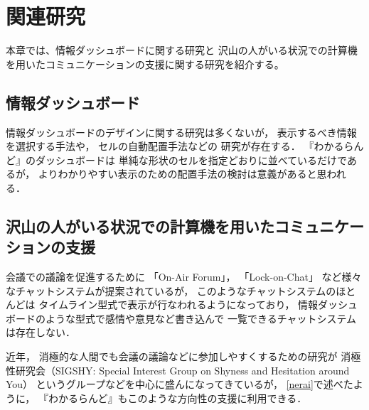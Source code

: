 \chapter{関連研究}
\label{chap:relevant}

本章では、情報ダッシュボードに関する研究と
沢山の人がいる状況での計算機を用いたコミュニケーションの支援に関する研究を紹介する。

\newpage

\section{情報ダッシュボード}

情報ダッシュボードのデザイン\cite{few}に関する研究は多くないが，
表示するべき情報を選択する手法\cite{Jones:2015:ECI:2800835.2800963}や，
セルの自動配置手法\cite{Hertzog:2015:BSP:2678025.2701383}などの
研究が存在する．
『わかるらんど』のダッシュボードは
単純な形状のセルを指定どおりに並べているだけであるが，
よりわかりやすい表示のための配置手法の検討は意義があると思われる．

\section{沢山の人がいる状況での計算機を用いたコミュニケーションの支援}
会議での議論を促進するために
「On-Air Forum」\cite{nishida2011}，
「Lock-on-Chat」\cite{nishida2006}
など様々なチャットシステムが提案されているが，
このようなチャットシステムのほとんどは
タイムライン型式で表示が行なわれるようになっており，
情報ダッシュボードのような型式で感情や意見など書き込んで
一覧できるチャットシステムは存在しない．

近年，
消極的な人間でも会議の議論などに参加しやすくするための研究が
消極性研究会（SIGSHY: Special Interest Group on Shyness and Hesitation around You）
というグループなどを中心に盛んになってきているが\cite{kurihara2016}\cite{nishida2011}，
\ref{nerai}で述べたように，
『わかるらんど』もこのような方向性の支援に利用できる．
